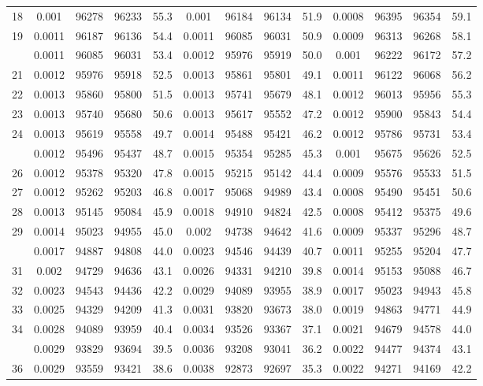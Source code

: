 \documentclass[
  14pt,
]{article}
\begin{document}
\begin{longtable}[t]{lcccccccccccc}
18 & 0.001 & 96278 & 96233 & 55.3 & 0.001 & 96184 & 96134 & 51.9 & 0.0008 & 96395 & 96354 & 59.1\\
19 & 0.0011 & 96187 & 96136 & 54.4 & 0.0011 & 96085 & 96031 & 50.9 & 0.0009 & 96313 & 96268 & 58.1\\
\addlinespace
20 & 0.0011 & 96085 & 96031 & 53.4 & 0.0012 & 95976 & 95919 & 50.0 & 0.001 & 96222 & 96172 & 57.2\\
21 & 0.0012 & 95976 & 95918 & 52.5 & 0.0013 & 95861 & 95801 & 49.1 & 0.0011 & 96122 & 96068 & 56.2\\
22 & 0.0013 & 95860 & 95800 & 51.5 & 0.0013 & 95741 & 95679 & 48.1 & 0.0012 & 96013 & 95956 & 55.3\\
23 & 0.0013 & 95740 & 95680 & 50.6 & 0.0013 & 95617 & 95552 & 47.2 & 0.0012 & 95900 & 95843 & 54.4\\
24 & 0.0013 & 95619 & 95558 & 49.7 & 0.0014 & 95488 & 95421 & 46.2 & 0.0012 & 95786 & 95731 & 53.4\\
\addlinespace
25 & 0.0012 & 95496 & 95437 & 48.7 & 0.0015 & 95354 & 95285 & 45.3 & 0.001 & 95675 & 95626 & 52.5\\
26 & 0.0012 & 95378 & 95320 & 47.8 & 0.0015 & 95215 & 95142 & 44.4 & 0.0009 & 95576 & 95533 & 51.5\\
27 & 0.0012 & 95262 & 95203 & 46.8 & 0.0017 & 95068 & 94989 & 43.4 & 0.0008 & 95490 & 95451 & 50.6\\
28 & 0.0013 & 95145 & 95084 & 45.9 & 0.0018 & 94910 & 94824 & 42.5 & 0.0008 & 95412 & 95375 & 49.6\\
29 & 0.0014 & 95023 & 94955 & 45.0 & 0.002 & 94738 & 94642 & 41.6 & 0.0009 & 95337 & 95296 & 48.7\\
\addlinespace
30 & 0.0017 & 94887 & 94808 & 44.0 & 0.0023 & 94546 & 94439 & 40.7 & 0.0011 & 95255 & 95204 & 47.7\\
31 & 0.002 & 94729 & 94636 & 43.1 & 0.0026 & 94331 & 94210 & 39.8 & 0.0014 & 95153 & 95088 & 46.7\\
32 & 0.0023 & 94543 & 94436 & 42.2 & 0.0029 & 94089 & 93955 & 38.9 & 0.0017 & 95023 & 94943 & 45.8\\
33 & 0.0025 & 94329 & 94209 & 41.3 & 0.0031 & 93820 & 93673 & 38.0 & 0.0019 & 94863 & 94771 & 44.9\\
34 & 0.0028 & 94089 & 93959 & 40.4 & 0.0034 & 93526 & 93367 & 37.1 & 0.0021 & 94679 & 94578 & 44.0\\
\addlinespace
35 & 0.0029 & 93829 & 93694 & 39.5 & 0.0036 & 93208 & 93041 & 36.2 & 0.0022 & 94477 & 94374 & 43.1\\
36 & 0.0029 & 93559 & 93421 & 38.6 & 0.0038 & 92873 & 92697 & 35.3 & 0.0022 & 94271 & 94169 & 42.2\\

\end{longtable}
\end{document}
